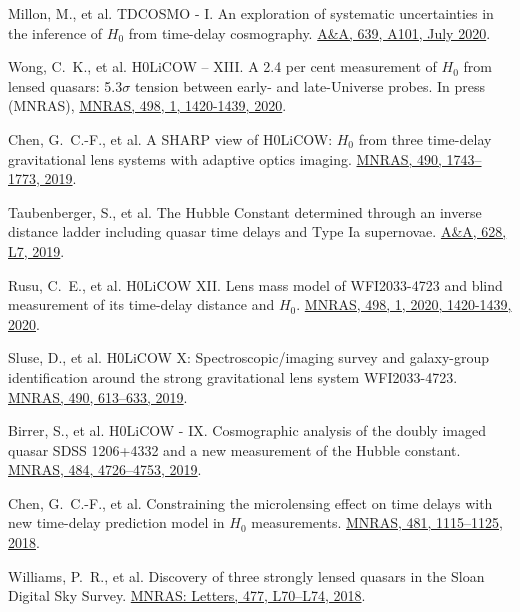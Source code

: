 \documentclass[margin, line]{res}
\begin{document}
\begin{resume}
\begin{etaremune}
	\item Millon, M., et al. TDCOSMO - I. An exploration of systematic uncertainties in the inference of $H_0$ from time-delay cosmography. \href{https://doi.org/10.1051/0004-6361/201937351}{A\&A, 639, A101, July 2020}.
	\item Wong, C.~K., et al. H0LiCOW – XIII. A 2.4 per cent measurement of $H_0$ from lensed quasars: 5.3$\sigma$ tension between early- and late-Universe probes. In press (MNRAS), \href{https://doi.org/10.1093/mnras/stz3094}{MNRAS, 498, 1, 1420-1439, 2020}.
	\item Chen, G.~C.-F., et al. A SHARP view of H0LiCOW: $H_0$ from three time-delay gravitational lens systems with adaptive optics imaging. \href{https://academic.oup.com/mnras/article/doi/10.1093/mnras/stz2547/5568378/}{MNRAS, 490, 1743--1773, 2019}.
	\item Taubenberger, S., et al. The Hubble Constant determined through an inverse distance ladder including quasar time delays and Type Ia supernovae. \href{https://www.aanda.org/articles/aa/abs/2019/08/aa35980-19/aa35980-19.html}{A\&A, 628, L7, 2019}.
	\item Rusu, C.~E., et al. H0LiCOW XII. Lens mass model of WFI2033-4723 and blind measurement of its time-delay distance and $H_0$. \href{http://adsabs.harvard.edu/abs/2019arXiv190509338R}{MNRAS, 498, 1, 2020, 1420-1439, 2020}.
	\item Sluse, D., et al. H0LiCOW X: Spectroscopic/imaging survey and galaxy-group identification around the strong gravitational lens system WFI2033-4723. \href{https://academic.oup.com/mnras/article/doi/10.1093/mnras/stz2483/5561514/}{MNRAS, 490, 613--633, 2019}.
	\item Birrer, S., et al. H0LiCOW - IX. Cosmographic analysis of the doubly imaged quasar SDSS 1206+4332 and a new measurement of the Hubble constant. \href{https://doi.org/10.1093/mnras/stz200}{MNRAS, 484, 4726--4753, 2019}.
	\item Chen, G.~C.-F., et al. Constraining the microlensing effect on time delays with new time-delay prediction model in $H_0$ measurements. \href{https://doi.org/10.1093/mnras/sty2350}{MNRAS, 481, 1115--1125, 2018}.
 	\item Williams, P.~R., et al. Discovery of three strongly lensed quasars in the Sloan Digital Sky Survey. \href{https://doi.org/10.1093/mnrasl/sly043}{MNRAS: Letters, 477, L70--L74, 2018}.
\end{etaremune}


\end{resume}
\end{document}
